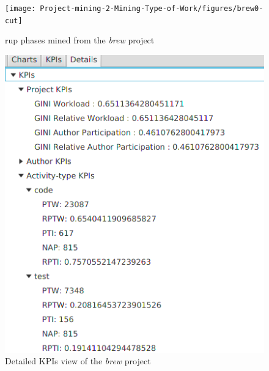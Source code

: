 
\begin{figure}
    \centering
    \texttt{[image: Project-mining-2-Mining-Type-of-Work/figures/brew0-cut]}
    \caption{\gls{rup} phases mined from the \textsl{brew} project}
    \label{fig:rup-phases}
\end{figure}

\begin{figure}
    \centering
    \includegraphics[width=.6\textwidth]{Project-mining-2-Mining-Type-of-Work/figures/brew3-cut}
    \caption{Detailed KPIs view of the \textsl{brew} project}
    \label{fig:brew3}
\end{figure}

